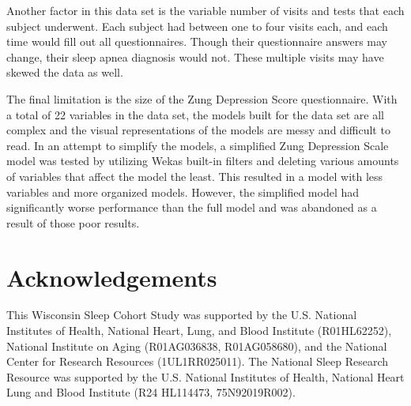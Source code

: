 \documentclass[10pt,conference,a4paper]{IEEEtran}
\begin{document}
Another factor in this data set is the variable number of visits and tests that each subject underwent. Each subject had between one to four visits each, and each time would fill out all questionnaires. Though their questionnaire answers may change, their sleep apnea diagnosis would not. These multiple visits may have skewed the data as well. \par
The final limitation is the size of the Zung Depression Score questionnaire. With a total of 22 variables in the data set, the models built for the data set are all complex and the visual representations of the models are messy and difficult to read. In an attempt to simplify the models, a simplified Zung Depression Scale model was tested by utilizing Wekas built-in filters and deleting various amounts of variables that affect the model the least. This resulted in a model with less variables and more organized models. However, the simplified model had significantly worse performance than the full model and was abandoned as a result of those poor results.


\section{Acknowledgements}
This Wisconsin Sleep Cohort Study was supported by the U.S. National Institutes of Health, National Heart, Lung, and Blood Institute (R01HL62252), National Institute on Aging (R01AG036838, R01AG058680), and the National Center for Research Resources (1UL1RR025011). The National Sleep Research Resource was supported by the U.S. National Institutes of Health, National Heart Lung and Blood Institute (R24 HL114473, 75N92019R002). \cite{Young2009}\cite{Zhang2018}







\end{document}
